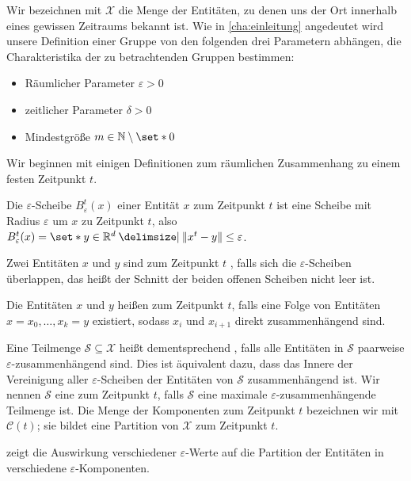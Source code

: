 
Wir bezeichnen mit $\mathcal{X}$ die Menge der Entitäten, zu denen uns der Ort innerhalb eines gewissen Zeitraums bekannt ist.
Wie in \cref{cha:einleitung} angedeutet wird unsere Definition einer Gruppe von den folgenden drei Parametern abhängen, die Charakteristika der zu betrachtenden Gruppen bestimmen:
\begin{itemize}
	\item Räumlicher Parameter $\varepsilon > 0$
	\item zeitlicher Parameter $\delta > 0$
	\item Mindestgröße $m \in \mathbb{N}\setminus \set*{0}$
\end{itemize}
Wir beginnen mit einigen Definitionen zum räumlichen Zusammenhang zu einem festen Zeitpunkt $t$.
\begin{definition}[{name=[Epsilon-Zusammenhang]}]
	Die $\varepsilon$-Scheibe $B_\varepsilon^t(x)$ einer Entität $x$ zum Zeitpunkt $t$ ist eine Scheibe mit Radius $\varepsilon$ um $x$ zu Zeitpunkt $t$, also $B_\varepsilon^t(x) = \set*{y \in \mathbb{R}^d \given \norm*{x^t-y} \le \varepsilon}$.
	
	Zwei Entitäten $x$ und $y$ sind zum Zeitpunkt $t$ , falls sich die $\varepsilon$-Scheiben überlappen, das heißt der Schnitt der beiden offenen Scheiben nicht leer ist.
	
	Die Entitäten $x$ und $y$ heißen  zum Zeitpunkt $t$, falls eine Folge von Entitäten $x=x_0, \ldots, x_k = y$ existiert, sodass $x_i$ und $x_{i+1}$ direkt zusammenhängend sind.
\end{definition}

Eine Teilmenge $\mathcal{S} \subseteq \mathcal{X}$ heißt dementsprechend , falls alle Entitäten in $\mathcal{S}$ paarweise $\varepsilon$-zusammenhängend sind.
Dies ist äquivalent dazu, dass das Innere der Vereinigung aller $\varepsilon$-Scheiben der Entitäten von $\mathcal{S}$ zusammenhängend ist.
Wir nennen $\mathcal{S}$ eine  zum Zeitpunkt $t$, falls $\mathcal{S}$ eine maximale $\varepsilon$-zusammenhängende Teilmenge ist.
Die Menge der Komponenten zum Zeitpunkt $t$ bezeichnen wir mit $\mathcal{C}(t)$; sie bildet eine Partition von $\mathcal{X}$ zum Zeitpunkt $t$.

 zeigt die Auswirkung verschiedener $\varepsilon$-Werte auf die Partition der Entitäten in verschiedene $\varepsilon$-Komponenten.

